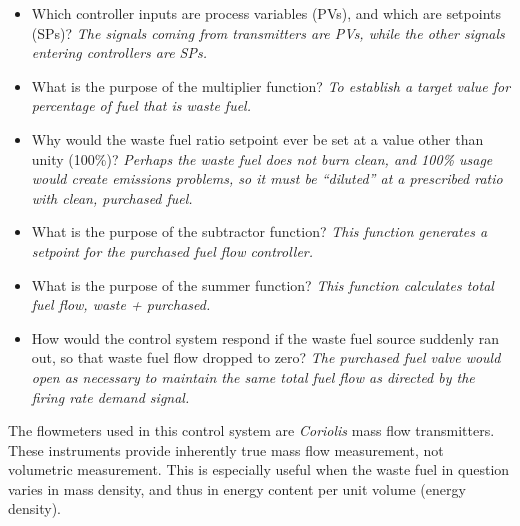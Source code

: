 





\begin{itemize}
\item{} Which controller inputs are process variables (PVs), and which are setpoints (SPs)? {\it The signals coming from transmitters are PVs, while the other signals entering controllers are SPs.}
\vskip 10pt
\item{} What is the purpose of the multiplier function? {\it To establish a target value for percentage of fuel that is waste fuel.}
\vskip 10pt
\item{} Why would the waste fuel ratio setpoint ever be set at a value other than unity (100\%)? {\it Perhaps the waste fuel does not burn clean, and 100\% usage would create emissions problems, so it must be ``diluted'' at a prescribed ratio with clean, purchased fuel.}
\vskip 10pt
\item{} What is the purpose of the subtractor function? {\it This function generates a setpoint for the purchased fuel flow controller.}
\vskip 10pt
\item{} What is the purpose of the summer function? {\it This function calculates total fuel flow, waste + purchased.}
\vskip 10pt
\item{} How would the control system respond if the waste fuel source suddenly ran out, so that waste fuel flow dropped to zero? {\it The purchased fuel valve would open as necessary to maintain the same total fuel flow as directed by the firing rate demand signal.}
\end{itemize}

\vskip 10pt

The flowmeters used in this control system are {\it Coriolis} mass flow transmitters.  These instruments provide inherently true mass flow measurement, not volumetric measurement.  This is especially useful when the waste fuel in question varies in mass density, and thus in energy content per unit volume (energy density).




